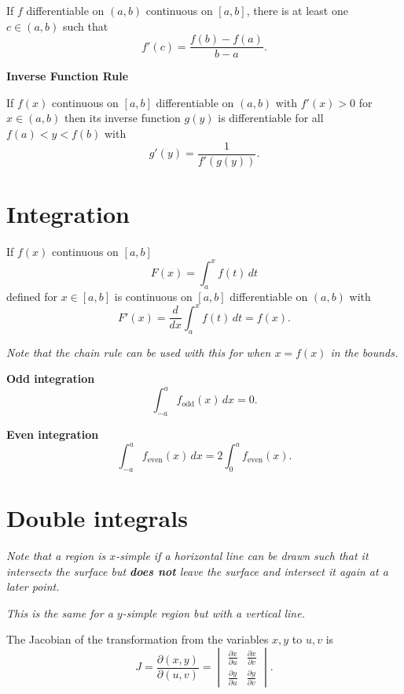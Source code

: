 \documentclass[10pt, a4paper]{article}
\begin{document}
\begin{theorem}
    If $f$ differentiable on $(a, b)$ continuous on $[a, b]$,
    there is at least one $c \in (a, b)$ such that
    \[
    f'(c) = \frac{f(b) - f(a)}{b - a}.
    \]
\end{theorem}

\textbf{Inverse Function Rule}

If $f(x)$ continuous on $[a, b]$ differentiable on $(a, b)$ with $f'(x) > 0$ for $x \in (a, b)$ then its inverse function $g(y)$ is differentiable for all $f(a) < y < f(b)$ with
\[
g'(y) = \frac{1}{f'(g(y))}.
\]

\newpage

\section{Integration}

\begin{theorem}
    If $f(x)$ continuous on $[a, b]$
    \[
    F(x) = \int_{a}^{x}f(t)\,dt
    \]
    defined for $x \in [a, b]$ is continuous on $[a, b]$ differentiable on $(a, b)$ with
    \[
    F'(x) = \frac{d}{dx}\int_{a}^{x}f(t)\,dt = f(x).
    \]
\end{theorem}
\textit{Note that the chain rule can be used with this for when $x = f(x)$ in the bounds.}


\textbf{Odd integration}
\[
\int_{-a}^{a}f_{\text{odd}}(x)\,dx = 0.
\]

\textbf{Even integration}
\[
\int_{-a}^{a}f_{\text{even}}(x)\,dx = 2\int_{0}^{a}f_{\text{even}}(x).
\]

\newpage

\section{Double integrals}

\textit{Note that a region is $x$-simple if a horizontal line can be drawn such that it intersects the surface but \textbf{does not} leave the surface and intersect it again at a later point.}

\textit{This is the same for a $y$-simple region but with a vertical line.}

\begin{definition}
    The Jacobian of the transformation from the variables $x, y$ to $u, v$ is
    \[
    J = \frac{\partial(x, y)}{\partial(u, v)} = \begin{vmatrix}
        \frac{\partial x}{\partial u} & \frac{\partial x}{\partial v} \\
        \frac{\partial y}{\partial u} & \frac{\partial y}{\partial v}
    \end{vmatrix}.
    \]
\end{definition}
\end{document}
